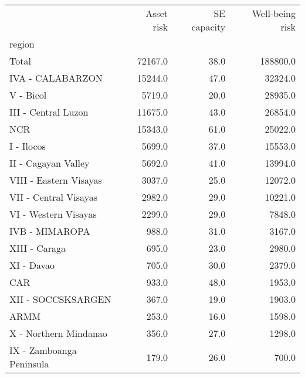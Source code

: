\begin{tabular}{lrrr}
\toprule
{} &  Asset risk &  SE capacity &  Well-being risk \\
region                   &             &              &                  \\
\midrule
Total                    &     72167.0 &         38.0 &         188800.0 \\
IVA - CALABARZON         &     15244.0 &         47.0 &          32324.0 \\
V - Bicol                &      5719.0 &         20.0 &          28935.0 \\
III - Central Luzon      &     11675.0 &         43.0 &          26854.0 \\
NCR                      &     15343.0 &         61.0 &          25022.0 \\
I - Ilocos               &      5699.0 &         37.0 &          15553.0 \\
II - Cagayan Valley      &      5692.0 &         41.0 &          13994.0 \\
VIII - Eastern Visayas   &      3037.0 &         25.0 &          12072.0 \\
VII - Central Visayas    &      2982.0 &         29.0 &          10221.0 \\
VI - Western Visayas     &      2299.0 &         29.0 &           7848.0 \\
IVB - MIMAROPA           &       988.0 &         31.0 &           3167.0 \\
XIII - Caraga            &       695.0 &         23.0 &           2980.0 \\
XI - Davao               &       705.0 &         30.0 &           2379.0 \\
CAR                      &       933.0 &         48.0 &           1953.0 \\
XII - SOCCSKSARGEN       &       367.0 &         19.0 &           1903.0 \\
ARMM                     &       253.0 &         16.0 &           1598.0 \\
X - Northern Mindanao    &       356.0 &         27.0 &           1298.0 \\
IX - Zamboanga Peninsula &       179.0 &         26.0 &            700.0 \\
\bottomrule
\end{tabular}
